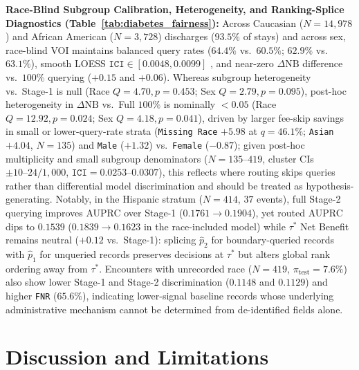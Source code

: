 \documentclass[11pt]{article}
\theoremstyle{remark}
\begin{document}
\textbf{Race-Blind Subgroup Calibration, Heterogeneity, and Ranking-Splice Diagnostics (Table~\ref{tab:diabetes_fairness}):} Across Caucasian ($N=14{,}978$) and African American ($N=3{,}728$) discharges ($93.5\%$ of stays) and across sex, race-blind VOI maintains balanced query rates ($64.4\%$ vs.\ $60.5\%$; $62.9\%$ vs.\ $63.1\%$), smooth LOESS $\texttt{ICI} \in [0.0048, 0.0099]$ \citep{austin2019integrated}, and near-zero $\Delta\text{NB}$ difference vs.\ $100\%$ querying ($+0.15$ and $+0.06$). Whereas subgroup heterogeneity vs.\ Stage-1 is null (Race $Q=4.70, p=0.453$; Sex $Q=2.79, p=0.095$), post-hoc heterogeneity in $\Delta\text{NB}$ vs.\ Full $100\%$ is nominally $< 0.05$ (Race $Q=12.92, p=0.024$; Sex $Q=4.18, p=0.041$), driven by larger fee-skip savings in small or lower-query-rate strata (\texttt{Missing Race} $+5.98$ at $q=46.1\%$; \texttt{Asian} $+4.04$, $N=135$) and \texttt{Male} ($+1.32$) vs.\ \texttt{Female} ($-0.87$); given post-hoc multiplicity and small subgroup denominators ($N=135\text{--}419$, cluster CIs $\pm 10\text{--}24/1{,}000$, $\texttt{ICI}=0.0253\text{--}0.0307$), this reflects where routing skips queries rather than differential model discrimination and should be treated as hypothesis-generating. Notably, in the Hispanic stratum ($N = 414$, $37$ events), full Stage-2 querying improves AUPRC over Stage-1 ($0.1761 \to 0.1904$), yet routed AUPRC dips to $0.1539$ ($0.1839 \to 0.1623$ in the race-included model) while $\tau^*$ Net Benefit remains neutral ($+0.12$ vs.\ Stage-1): splicing $\hat{p}_2$ for boundary-queried records with $\hat{p}_1$ for unqueried records preserves decisions at $\tau^*$ but alters global rank ordering away from $\tau^*$. Encounters with unrecorded race ($N = 419$, $\pi_{\text{test}} = 7.6\%$) also show lower Stage-1 and Stage-2 discrimination ($0.1148$ and $0.1129$) and higher \texttt{FNR} ($65.6\%$), indicating lower-signal baseline records whose underlying administrative mechanism cannot be determined from de-identified fields alone.

\section{Discussion and Limitations}
\label{sec:discussion}
\end{document}
